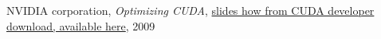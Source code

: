 \documentclass[12pt]{report}
\begin{document}
\begin{thebibliography}{9}
		NVIDIA corporation, \textit{Optimizing CUDA}, \href{http://developer.download.nvidia.com/CUDA/training/NVIDIA_GPU_Computing_Webinars_CUDA_Optimization_April-2009.pdf}{slides how from CUDA developer download, available here}, 2009
		
		
		
		
		
		
	\end{thebibliography}

\end{document}
